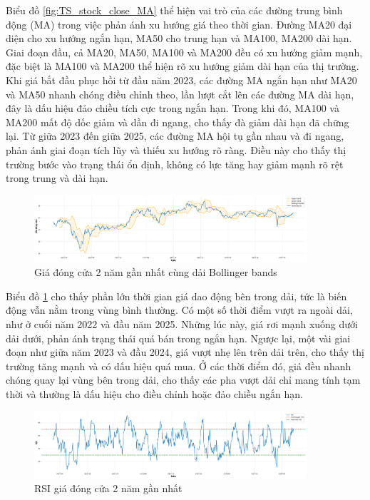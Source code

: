    Biểu đồ  \ref{fig:TS_stock_close_MA} thể hiện vai trò của các đường trung bình động (MA) trong việc phản ánh xu hướng giá theo thời gian. Đường MA20 đại diện cho xu hướng ngắn hạn, MA50 cho trung hạn và MA100, MA200 dài hạn. Giai đoạn đầu, cả MA20, MA50, MA100 và MA200 đều có xu hướng giảm mạnh, đặc biệt là MA100 và MA200 thể hiện rõ xu hướng giảm dài hạn của thị trường. Khi giá bắt đầu phục hồi từ đầu năm 2023, các đường MA ngắn hạn như MA20 và MA50 nhanh chóng điều chỉnh theo, lần lượt cắt lên các đường MA dài hạn, đây là dấu hiệu đảo chiều tích cực trong ngắn hạn. Trong khi đó, MA100 và MA200 mất độ dốc giảm và dần đi ngang, cho thấy đà giảm dài hạn đã chững lại. Từ giữa 2023 đến giữa 2025, các đường MA hội tụ gần nhau và đi ngang, phản ánh giai đoạn tích lũy và thiếu xu hướng rõ ràng. Điều này cho thấy thị trường bước vào trạng thái ổn định, không có lực tăng hay giảm mạnh rõ rệt trong trung và dài hạn.

    \begin{figure}[htp]
        \centering
        \includegraphics[width=0.90\textwidth]{images/TS_stock_bollinger.png}
        \caption{Giá đóng cửa 2 năm gần nhất cùng dải Bollinger bands}
        \label{fig:TS_stock_bollinger}
    \end{figure}
    \FloatBarrier

     Biểu đồ  \ref{fig:TS_stock_bollinger} cho thấy phần lớn thời gian giá dao động bên trong dải, tức là biến động vẫn nằm trong vùng bình thường. Có một số thời điểm vượt ra ngoài dải, như ở cuối năm 2022 và đầu năm 2025. Những lúc này, giá rơi mạnh xuống dưới dải dưới, phản ánh trạng thái quá bán trong ngắn hạn. Ngược lại, một vài giai đoạn như giữa năm 2023 và đầu 2024, giá vượt nhẹ lên trên dải trên, cho thấy thị trường tăng mạnh và có dấu hiệu quá mua. Ở các thời điểm đó, giá đều nhanh chóng quay lại vùng bên trong dải, cho thấy các pha vượt dải chỉ mang tính tạm thời và thường là dấu hiệu cho điều chỉnh hoặc đảo chiều ngắn hạn.

     \begin{figure}[htp]
        \centering
        \includegraphics[width=0.90\textwidth]{images/TS_stock_RSI.png}
        \caption{RSI giá đóng cửa 2 năm gần nhất}
        \label{fig:TS_stock_RSI}
    \end{figure}
    \FloatBarrier

